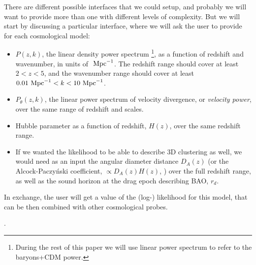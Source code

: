 There are different possible interfaces that we could setup, and probably
we will want to provide more than one with different levels of complexity.
But we will start by discussing a particular interface, where we will ask
the user to provide for each cosmological model:
\begin{itemize}
 \item $P(z,k)$, the linear density power spectrum
  \footnote{During the rest of this paper we will use linear power spectrum
  to refer to the baryons+CDM power.}, as a function of redshift and
  wavenumber, in units of $\ \text{Mpc}^{-1}$.
  The redshift range should cover at least $2 < z < 5$, and the wavenumber
  range should cover at least $0.01 \ \text{Mpc}^{-1} < k < 10 \ \text{Mpc}^{-1}$.
 \item $P_\theta(z,k)$, the linear power spectrum of velocity divergence,
  or \textit{velocity power}, over the same range of redshift and scales.
 \item Hubble parameter as a function of redshift, $H(z)$, over the same
  redshift range.
 \item If we wanted the likelihood to be able to describe 3D clustering as well,
  we would need as an input the angular diameter distance $D_A(z)$ (or the
  Alcock-Paczy\'nski coefficient, $\propto D_A(z) H(z)$, \cite{Alcock1979})
  over the full redshift range, as well as the sound horizon at the drag epoch
  describing BAO, $r_d$. 
\end{itemize}
 
In exchange, the user will get a value of the (log-) likelihood for this model,
that can be then combined with other cosmological probes.

.

